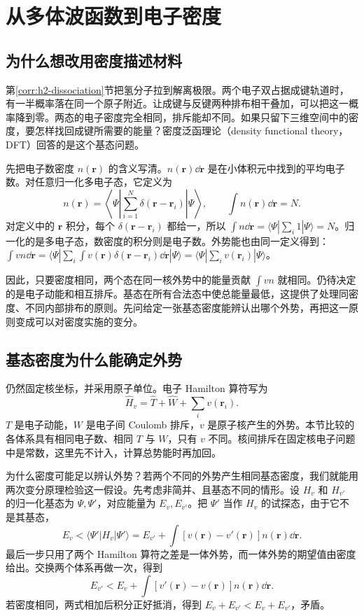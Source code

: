 \chapter{从多体波函数到电子密度}\label{dft:chapter}
\section{为什么想改用密度描述材料}
第\ref{corr:h2-dissociation}节把氢分子拉到解离极限。两个电子双占据成键轨道时，有一半概率落在同一个原子附近。让成键与反键两种排布相干叠加，可以把这一概率降到零。两态的电子密度完全相同，排斥能却不同。如果只留下三维空间中的密度，要怎样找回成键所需要的能量？密度泛函理论（density functional theory，DFT）回答的是这个基态问题。

先把电子数密度 $n(\bm r)$ 的含义写清。$n(\bm r)\dd\bm r$ 是在小体积元中找到的平均电子数。对任意归一化多电子态，它定义为
\begin{equation}
n(\bm r)=\left\langle\Psi\left|\sum_{i=1}^N\delta(\bm r-\bm r_i)\right|\Psi\right\rangle,
\qquad \int n(\bm r)\dd\bm r=N.
\end{equation}
对定义中的 $\bm r$ 积分，每个 $\delta(\bm r-\bm r_i)$ 都给一，所以 $\int n\dd\bm r=\langle\Psi|\sum_i1|\Psi\rangle=N$。归一化的是多电子态，数密度的积分则是电子数。外势能也由同一定义得到：$\int vn\dd\bm r=\langle\Psi|\sum_i\int v(\bm r)\delta(\bm r-\bm r_i)\dd\bm r|\Psi\rangle=\langle\Psi|\sum_i v(\bm r_i)|\Psi\rangle$。

因此，只要密度相同，两个态在同一核外势中的能量贡献 $\int vn$ 就相同。仍待决定的是电子动能和相互排斥。基态在所有合法态中使总能量最低，这提供了处理同密度、不同内部排布的原则。先问给定一张基态密度能辨认出哪个外势，再把这一原则变成可以对密度实施的变分。

\section{基态密度为什么能确定外势}
仍然固定核坐标，并采用原子单位。电子 Hamilton 算符写为
\begin{equation}
\hat H_v=\hat T+\hat W+\sum_i v(\bm r_i).
\end{equation}
$T$ 是电子动能，$W$ 是电子间 Coulomb 排斥，$v$ 是原子核产生的外势。本节比较的各体系具有相同电子数、相同 $T$ 与 $W$，只有 $v$ 不同。核间排斥在固定核电子问题中是常数，这里先不计入，计算总势能时再加回。

为什么密度可能足以辨认外势？若两个不同的外势产生相同基态密度，我们就能用两次变分原理检验这一假设。先考虑非简并、且基态不同的情形。设 $H_v$ 和 $H_{v'}$ 的归一化基态为 $\Psi,\Psi'$，对应能量为 $E_v,E_{v'}$。把 $\Psi'$ 当作 $H_v$ 的试探态，由于它不是其基态，
\begin{equation}
E_v<\langle\Psi'|H_v|\Psi'\rangle
=E_{v'}+\int[v(\bm r)-v'(\bm r)]n(\bm r)\dd\bm r.
\end{equation}
最后一步只用了两个 Hamilton 算符之差是一体外势，而一体外势的期望值由密度给出。交换两个体系再做一次，得到
\begin{equation}
E_{v'}<E_v+\int[v'(\bm r)-v(\bm r)]n(\bm r)\dd\bm r.
\end{equation}
若密度相同，两式相加后积分正好抵消，得到 $E_v+E_{v'}<E_v+E_{v'}$，矛盾。

